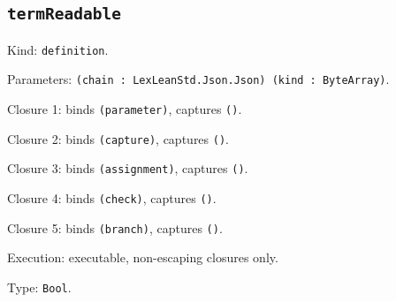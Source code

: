 \documentclass[11pt]{article}
\begin{document}
\subsection*{\texttt{termReadable}}
\noindent Kind: \texttt{definition}.\par
\noindent Parameters: \texttt{(chain : LexLeanStd.Json.Json) (kind : ByteArray)}.\par
\noindent Closure 1: binds \texttt{(parameter)}, captures \texttt{()}.\par
\noindent Closure 2: binds \texttt{(capture)}, captures \texttt{()}.\par
\noindent Closure 3: binds \texttt{(assignment)}, captures \texttt{()}.\par
\noindent Closure 4: binds \texttt{(check)}, captures \texttt{()}.\par
\noindent Closure 5: binds \texttt{(branch)}, captures \texttt{()}.\par
\noindent Execution: executable, non-escaping closures only.\par
\noindent Type: \texttt{Bool}.\par
\end{document}
